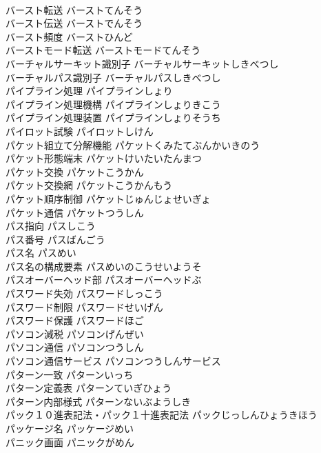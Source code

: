 \documentclass[8pt]{extreport}
\begin{document}
\begin{CJK}{UTF8}{min}
\\	バースト転送	バーストてんそう	
\\	バースト伝送	バーストでんそう	
\\	バースト頻度	バーストひんど	
\\	バーストモード転送	バーストモードてんそう	
\\	バーチャルサーキット識別子	バーチャルサーキットしきべつし	
\\	バーチャルパス識別子	バーチャルパスしきべつし	
\\	パイプライン処理	パイプラインしょり	
\\	パイプライン処理機構	パイプラインしょりきこう	
\\	パイプライン処理装置	パイプラインしょりそうち	
\\	パイロット試験	パイロットしけん	
\\	パケット組立て分解機能	パケットくみたてぶんかいきのう	
\\	パケット形態端末	パケットけいたいたんまつ	
\\	パケット交換	パケットこうかん	
\\	パケット交換網	パケットこうかんもう	
\\	パケット順序制御	パケットじゅんじょせいぎょ	
\\	パケット通信	パケットつうしん	
\\	パス指向	パスしこう	
\\	パス番号	パスばんごう	
\\	パス名	パスめい	
\\	パス名の構成要素	パスめいのこうせいようそ	
\\	パスオーバーヘッド部	パスオーバーヘッドぶ	
\\	パスワード失効	パスワードしっこう	
\\	パスワード制限	パスワードせいげん	
\\	パスワード保護	パスワードほご	
\\	パソコン減税	パソコンげんぜい	
\\	パソコン通信	パソコンつうしん	
\\	パソコン通信サービス	パソコンつうしんサービス	
\\	パターン一致	パターンいっち	
\\	パターン定義表	パターンていぎひょう	
\\	パターン内部様式	パターンないぶようしき	
\\	パック１０進表記法・パック１十進表記法	パックじっしんひょうきほう	
\\	パッケージ名	パッケージめい	
\\	パニック画面	パニックがめん	

\end{CJK}
\end{document}
